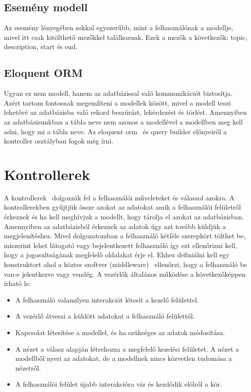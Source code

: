 \documentclass[
]{thesis-ekf}
\theoremstyle{definition}
\theoremstyle{remark}
\begin{document}
\subsection{Esemény modell}
Az esemény lényegében sokkal egyszerűbb, mint a felhasználónak a modellje, mivel itt csak kitölthető mezőkkel találkozunk. Ezek a mezők a következők: topic, description, start és end.

\subsection{Eloquent ORM}
Ugyan ez nem modell, hanem az adatbázissal való kommunikációt biztosítja. Azért tartom fontosnak megemlíteni a modellek között, mivel a modell teszi lehetővé az adatbázisba való rekord beszúrást, lekérdezést és törlést. Amennyiben az adatbázisunkban a tábla neve nem azonos a modellével a modellben meg kell adni, hogy mi a tábla neve. Az eloquent orm~\cite{laravel_eloquent} és query builder előnyeiről a kontroller osztályban fogok még írni.
\section{Kontrollerek}
A kontrollerek~\cite{laravel_controller} dolgozzák fel a felhasználói műveleteket és válaszol azokra. A kontrollerekben gyűjtjük össze azokat az adatokat amik a felhasználói felületről érkeznek és ha kell meghívjuk a modellt, hogy tárolja el azokat az adatbázisban. Amennyiben az adatbázisból érkeznek az adatok úgy azt tovább küldjük a megjelenítéshez. Mivel dolgozatomban a felhasználó kétféle szerepkört tölthet be, miszerint lehet látogató vagy bejelentkezett felhasználó így ezt ellenőrizni kell, hogy a jogosultságának megfelelő oldalakat érje el. Ehhez definiálni kell egy konstruktort ahol a köztes szoftver (middleware)~\cite{laravel_middlewear} ellenőrzi, hogy a felhasználó be van-e jelentkezve vagy vendég.
A vezérlők általános működése a következőképpen írható le:
\begin{itemize}
\item{A felhasználó valamilyen interakciót létesít a kezelő felülettel.}
\item{A vezérlő átveszi a küldött adatokat a felhasználó felülettől.}
\item{Kapcsolat létesítése a modellel, és ha szükséges az adatok módosítása.}
\item{ A nézet a válasz alapján létrehozza a megfelelő kezelési felületet. A nézet a modellből nyeri az adatokat, de a modellnek nincs közvetlen tudomása a nézetről.}
\item{A felhasználói felület újabb interakcióra vár és kezdődik elölről a kör.}
\end{itemize}
\end{document}
